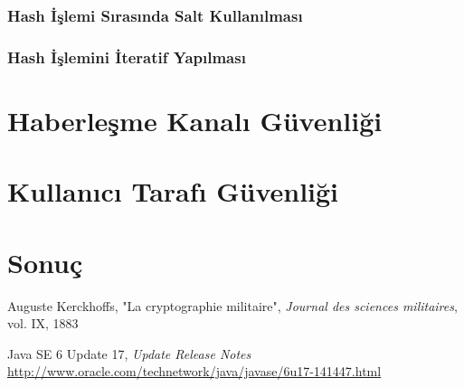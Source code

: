 \documentclass[11pt]{report}
\begin{document}
\subsection{Hash İşlemi Sırasında Salt Kullanılması}
\subsection{Hash İşlemini İteratif Yapılması}

\chapter{Haberleşme Kanalı Güvenliği}

\chapter{Kullanıcı Tarafı Güvenliği}

\chapter{Sonuç}


\begin{thebibliography}{9}

  Auguste Kerckhoffs,
  "La cryptographie militaire",
  \emph{Journal des sciences militaires},
  vol. IX,
  1883

  Java SE 6 Update 17, \emph{Update Release Notes} \\
  \url{http://www.oracle.com/technetwork/java/javase/6u17-141447.html}

\end{thebibliography}
\end{document}
